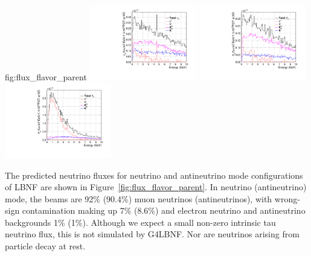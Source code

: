 \begin{dunefigure}{fig:flux_flavor_parent}
     \includegraphics[width=0.35\textwidth]{graphics/dune_antineutrino_nd_nue.pdf}
    \includegraphics[width=0.35\textwidth]{graphics/dune_neutrino_nd_nuebar.pdf}
     \includegraphics[width=0.35\textwidth]{graphics/dune_antineutrino_nd_nuebar.pdf}
\end{dunefigure}

The predicted neutrino fluxes for neutrino and antineutrino mode configurations of LBNF are shown in Figure~\ref{fig:flux_flavor_parent}.  In neutrino (antineutrino) mode, the beams are 92\% (90.4\%) muon neutrinos (antineutrinos), with wrong-sign contamination making up 7\% (8.6\%) and electron neutrino and antineutrino backgrounds 1\% (1\%).  Although %
we expect a small non-zero intrinsic tau neutrino flux, this is not simulated by G4LBNF.  Nor are neutrinos arising from particle decay at rest. %

